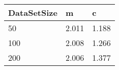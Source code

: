\begin{tabular}{lll}
DataSetSize & m & c \\ 
\hline 
50 & 2.011 & 1.188 \\ 
100 & 2.008 & 1.266 \\ 
200 & 2.006 & 1.377 \\ 
\hline 
\end{tabular}